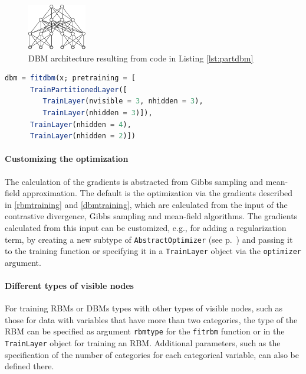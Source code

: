 \documentclass[12pt]{article}
\newcommand{\inlinecode}[1]{\texttt{#1}}
\begin{document}
\begin{figure}[h]
   \centering
   \includegraphics[scale=3.]{images/SmallPartitionedDBM.pdf}
   \caption{DBM architecture resulting from code in Listing \ref{lst:partdbm}}
\label{fig:smallpartitioneddbm}
\end{figure}

\begin{lstlisting}[language=Julia,caption={Fitting a partitioned DBM},label={lst:partdbm}, float=!h]
dbm = fitdbm(x; pretraining = [
      TrainPartitionedLayer([
         TrainLayer(nvisible = 3, nhidden = 3),
         TrainLayer(nhidden = 3)]),
      TrainLayer(nhidden = 4),
      TrainLayer(nhidden = 2)])
\end{lstlisting}

\FloatBarrier
\paragraph{Customizing the optimization}

The calculation of the gradients is abstracted from Gibbs sampling and mean-field approximation.
The default is the optimization via the gradients described in \ref{rbmtraining} and \ref{dbmtraining}, which are calculated from the input of the contrastive divergence, Gibbs sampling and mean-field algorithms.
The gradients calculated from this input can be customized, e.g., for adding a regularization term, by creating a new subtype of \inlinecode{AbstractOptimizer} (see p.\ \pageref{bms_AbstractOptimizer}) and passing it to the training function or specifying it in a \inlinecode{TrainLayer} object via the \inlinecode{optimizer} argument.


\paragraph{Different types of visible nodes}

For training RBMs or DBMs types with other types of visible nodes, such as those for data with variables that have more than two categories, the type of the RBM can be specified as argument \inlinecode{rbmtype} for the \inlinecode{fitrbm} function or in the \inlinecode{TrainLayer} object for training an RBM.
Additional parameters, such as the specification of the number of categories for each categorical variable, can also be defined there.
\end{document}

